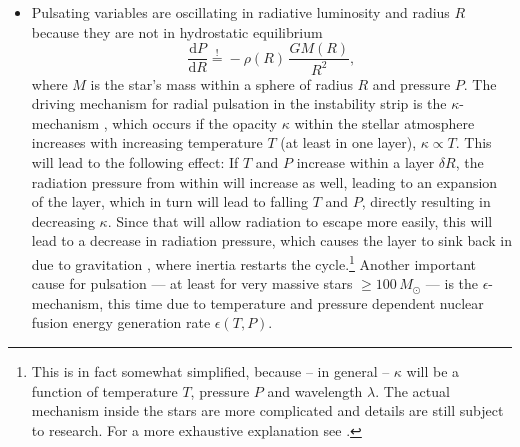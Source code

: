 \begin{itemize}
\item Pulsating variables are oscillating in radiative luminosity and radius $R$ because they are not in hydrostatic equilibrium
\begin{equation}
\label{eq:hydrostatic-equilibrium}
\frac{\mathrm{d}P}{\mathrm{d}R} \overset{!}= - \rho(R) \, \frac{G M(R)}{R^2},
\end{equation}
where $M$ is the star's mass within a sphere of radius $R$ and pressure $P$. The driving mechanism for radial pulsation in the instability strip is the $\kappa$-mechanism \citep{buchler1993}, which occurs if the opacity $\kappa$ within the stellar atmosphere increases with increasing temperature $T$ (at least in one layer), \ie $\kappa \propto T$. This will lead to the following effect: If $T$ and $P$ increase within a layer $\delta R$, the radiation pressure from within will increase as well, leading to an expansion of the layer, which in turn will lead to falling $T$ and $P$, directly resulting in decreasing $\kappa$. Since that will allow radiation to escape more easily, this will lead to a decrease in radiation pressure, which causes the layer to sink back in due to gravitation \citep{goodman2011}, where inertia restarts the cycle.\footnote{This is in fact somewhat simplified, because -- in general -- $\kappa$ will be a function of temperature $T$, pressure $P$ and wavelength $\lambda$. The actual mechanism inside the stars are more complicated and details are still subject to research. For a more exhaustive explanation see \citet{cox1980, percy2007}.} Another important cause for pulsation --- at least for very massive stars $\ge 100 \, \unit{M_\odot}$ \citep{buchler1993} --- is the $\epsilon$-mechanism, this time due to temperature and pressure dependent nuclear fusion energy generation rate $\epsilon(T, P)$.\\


\end{itemize}
